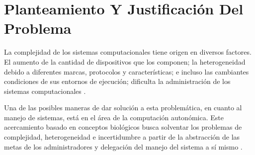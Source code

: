 \documentclass[12pt]{article}
\begin{document}

    \section{Planteamiento Y Justificación Del Problema}
    
    

    La complejidad de los sistemas computacionales tiene origen en diversos factores. El aumento de la cantidad de dispositivos que los componen; la heterogeneidad debido a diferentes marcas, protocolos y características; e incluso las cambiantes condiciones de sus entornos de ejecución; dificulta la administración de los sistemas computacionales \cite{emerging_2005}.


    Una de las posibles maneras de dar solución a esta problemática, en cuanto al manejo de sistemas, está en el área de la computación autonómica. Este acercamiento basado en conceptos biológicos busca solventar los problemas de complejidad, heterogeneidad e incertidumbre \cite{emerging_2005} a partir de la abstracción de las metas de los administradores y delegación del manejo del sistema a sí mismo \cite{lalanda_diaconescu_mccann_2014}.

    
\end{document}
